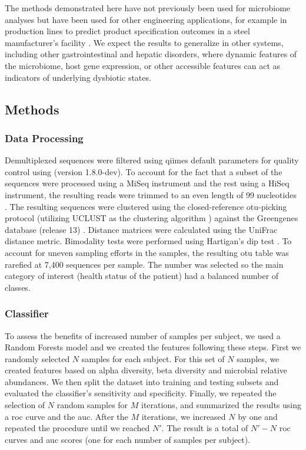 The methods demonstrated here have not previously been used for microbiome analyses but have been used for other engineering applications, for example in production lines to predict product specification outcomes in a steel manufacturer's facility \cite{RN4216}. We expect the results to generalize in other systems, including other gastrointestinal and hepatic disorders, where dynamic features of the microbiome, host gene expression, or other accessible features can act as indicators of underlying dysbiotic states.

\subsection{Methods}

\subsubsection{Data Processing}

Demultiplexed sequences were filtered using \glspl{qiime} \cite{RN110} default 
parameters for quality control using (version 1.8.0-dev). To account for the 
fact that a subset of the sequences were processed using a MiSeq instrument and 
the rest using a HiSeq instrument, the resulting reads were trimmed to an even 
length of 99 nucleotides \cite{RN4221, RN4222}. The resulting sequences were 
clustered using the closed-reference \gls{otu}-picking protocol (utilizing 
UCLUST as the clustering algorithm \cite{RN81}) against the Greengenes database 
(release 13) \cite{RN165}. Distance matrices were calculated 
using the UniFrac \cite{RN83} distance metric. Bimodality tests were performed 
using Hartigan's dip test \cite{RN4017}. To account for uneven sampling efforts 
in the samples, the resulting \gls{otu} table was rarefied at 7,400 sequences 
per sample. The number was selected so the main category of interest (health 
status of the patient) had a balanced number of classes.

\subsubsection{Classifier}

To assess the benefits of increased number of samples per subject, we used a 
Random Forests \cite{RN4205} model and we created the features following these 
steps. First we randomly selected $N$ samples for each subject.  For this set 
of $N$ samples, we created features based on alpha diversity, beta diversity 
and microbial relative abundances. We then split the dataset into training and 
testing subsets and evaluated the classifier's sensitivity and specificity.  
Finally, we repeated the selection of $N$ random samples for $M$ iterations, 
and summarized the results using a \gls{roc} curve and the \gls{auc}. After the 
$M$ iterations, we increased $N$ by one and repeated the procedure until we 
reached $N'$. The result is a total of $N'-N$ \gls{roc} curves and \gls{auc} 
scores (one for each number of samples per subject).

